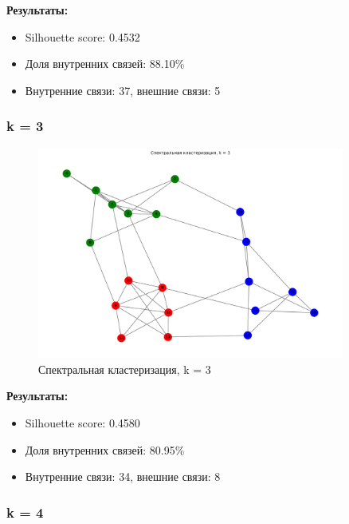 \textbf{Результаты:}
\begin{itemize}
    \item Silhouette score: 0.4532
    \item Доля внутренних связей: 88.10\%
    \item Внутренние связи: 37, внешние связи: 5
\end{itemize}

\subsubsection*{k = 3}

\begin{figure}[H]
    \centering
    \includegraphics[width=0.9\textwidth]{images/task1/clustering_k3.png}
    \caption{Спектральная кластеризация, k = 3}
\end{figure}

\textbf{Результаты:}
\begin{itemize}
    \item Silhouette score: 0.4580
    \item Доля внутренних связей: 80.95\%
    \item Внутренние связи: 34, внешние связи: 8
\end{itemize}

\subsubsection*{k = 4}

